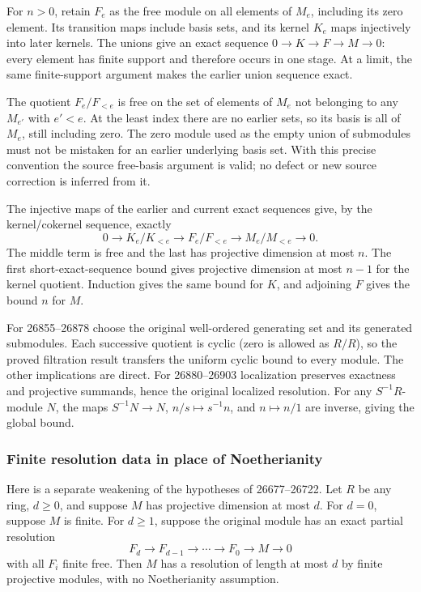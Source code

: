 For \(n>0\), retain \(F_e\) as the free module on all elements of \(M_e\), including its zero element. Its transition maps include basis sets, and its kernel \(K_e\) maps injectively into later kernels. The unions give an exact sequence \(0\to K\to F\to M\to0\): every element has finite support and therefore occurs in one stage. At a limit, the same finite-support argument makes the earlier union sequence exact.

The quotient \(F_e/F_{<e}\) is free on the set of elements of \(M_e\) not belonging to any \(M_{e'}\) with \(e'<e\). At the least index there are no earlier sets, so its basis is all of \(M_e\), still including zero. The zero module used as the empty union of submodules must not be mistaken for an earlier underlying basis set. With this precise convention the source free-basis argument is valid; no defect or new source correction is inferred from it.

The injective maps of the earlier and current exact sequences give, by the kernel/cokernel sequence, exactly \[
0\to K_e/K_{<e}\to F_e/F_{<e}\to M_e/M_{<e}\to0.
\] The middle term is free and the last has projective dimension at most \(n\). The first short-exact-sequence bound gives projective dimension at most \(n-1\) for the kernel quotient. Induction gives the same bound for \(K\), and adjoining \(F\) gives the bound \(n\) for \(M\).

For 26855--26878 choose the original well-ordered generating set and its generated submodules. Each successive quotient is cyclic (zero is allowed as \(R/R\)), so the proved filtration result transfers the uniform cyclic bound to every module. The other implications are direct. For 26880--26903 localization preserves exactness and projective summands, hence the original localized resolution. For any \(S^{-1}R\)-module \(N\), the maps \(S^{-1}N\to N\), \(n/s\mapsto s^{-1}n\), and \(n\mapsto n/1\) are inverse, giving the global bound.

\subsubsection{Finite resolution data in place of Noetherianity}\label{finite-resolution-data-in-place-of-noetherianity}

Here is a separate weakening of the hypotheses of 26677--26722. Let \(R\) be any ring, \(d\ge0\), and suppose \(M\) has projective dimension at most \(d\). For \(d=0\), suppose \(M\) is finite. For \(d\ge1\), suppose the original module has an exact partial resolution \[
F_d\longrightarrow F_{d-1}\longrightarrow\cdots
\longrightarrow F_0\longrightarrow M\longrightarrow0
\] with all \(F_i\) finite free. Then \(M\) has a resolution of length at most \(d\) by finite projective modules, with no Noetherianity assumption.

